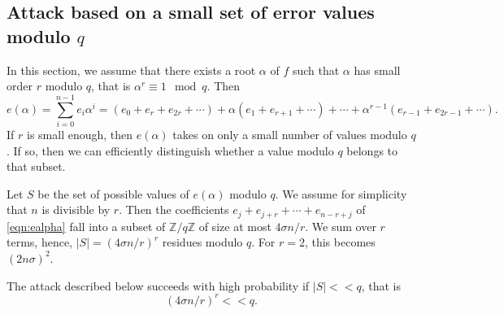 \documentclass{llncs}
\newcommand{\ZZ}{\mathbb{Z}}
\newcommand{\<}{\langle}
\renewcommand{\>}{\rangle}
\begin{document}
\subsection{Attack based on a small set of error values modulo $q$}
\label{sec:SmallSet}

In this section, we assume that there exists a root $\alpha$ of $f$ such that $\alpha$ has small order $r$ modulo $q$, that is $\alpha^r \equiv 1 \mod{q}$. Then
\begin{equation}
        \label{eqn:ealpha}
        e(\alpha)= \sum_{i=0}^{n-1} e_i \alpha^i = (e_0 + e_r+e_{2r}+ \cdots) + \alpha(e_1+e_{r+1}+\cdots) + \cdots + \alpha^{r-1}(e_{r-1}+e_{2r-1}+\cdots).
\end{equation}
If $r$ is small enough, then $e(\alpha)$ takes on only a small number of values modulo $q$.  If so, then we can efficiently distinguish whether a value modulo $q$ belongs to that subset.




Let $S$ be the set of possible values of $e(\alpha)$ modulo $q$.   We assume for simplicity that $n$ is divisible by $r$.  Then the coefficients $e_j+e_{j+r}+\cdots+ e_{n-r+j}$ of \eqref{eqn:ealpha} fall into a subset of $\ZZ/q\ZZ$ of size at most $4\sigma n/r$.
We sum over $r$ terms,
hence, $|S| = (4\sigma n/r )^r$ residues modulo $q$.  For $r=2$, this becomes $(2n\sigma)^2$.




The attack described below succeeds with high probability if $|S| << q$, that is
\begin{equation*}
        (4\sigma n /r)^r << q.
\end{equation*}
\end{document}

